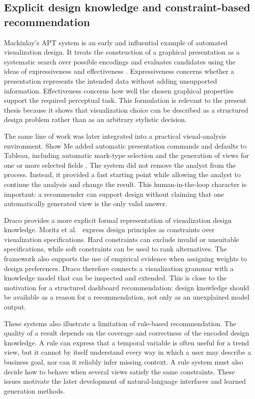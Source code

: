 \subsection{Explicit design knowledge and constraint-based recommendation}

Mackinlay's APT system is an early and influential example of automated visualization design. It treats the construction of a graphical presentation as a systematic search over possible encodings and evaluates candidates using the ideas of expressiveness and effectiveness \cite{mackinlay1986apt}. Expressiveness concerns whether a presentation represents the intended data without adding unsupported information. Effectiveness concerns how well the chosen graphical properties support the required perceptual task. This formulation is relevant to the present thesis because it shows that visualization choice can be described as a structured design problem rather than as an arbitrary stylistic decision.

The same line of work was later integrated into a practical visual-analysis environment. Show Me added automatic presentation commands and defaults to Tableau, including automatic mark-type selection and the generation of views for one or more selected fields \cite{mackinlay2007showme}. The system did not remove the analyst from the process. Instead, it provided a fast starting point while allowing the analyst to continue the analysis and change the result. This human-in-the-loop character is important: a recommender can support design without claiming that one automatically generated view is the only valid answer.

Draco provides a more explicit formal representation of visualization design knowledge. Moritz et al.~\cite{moritz2019draco} express design principles as constraints over visualization specifications. Hard constraints can exclude invalid or unsuitable specifications, while soft constraints can be used to rank alternatives. The framework also supports the use of empirical evidence when assigning weights to design preferences. Draco therefore connects a visualization grammar with a knowledge model that can be inspected and extended. This is close to the motivation for a structured dashboard recommendation: design knowledge should be available as a reason for a recommendation, not only as an unexplained model output.

These systems also illustrate a limitation of rule-based recommendation. The quality of a result depends on the coverage and correctness of the encoded design knowledge. A rule can express that a temporal variable is often useful for a trend view, but it cannot by itself understand every way in which a user may describe a business goal, nor can it reliably infer missing context. A rule system must also decide how to behave when several views satisfy the same constraints. These issues motivate the later development of natural-language interfaces and learned generation methods.


